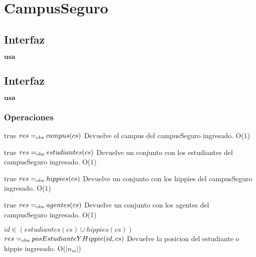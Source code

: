 
\section{CampusSeguro}

\subsection{Interfaz}

$\textbf{usa}$  


\subsection{Interfaz}

$\textbf{usa}$  


\subsubsection*{Operaciones}



 {true}
 {$res =_{\mathrm{obs}} campus(cs)$}
 {Devuelve el campus del campusSeguro ingresado.}
 {O($1$)}
 {}
 
 {true}
 {$res =_{\mathrm{obs}} estudiantes(cs)$}
 {Devuelve un conjunto con los estudiantes del campusSeguro ingresado.}
 {O($1$)}
 {}
 
 {true}
 {$res =_{\mathrm{obs}} hippies(cs)$}
 {Devuelve un conjunto con los hippies del campusSeguro ingresado.}
 {O($1$)}
 {}

 {true}
 {$res =_{\mathrm{obs}} agentes(cs)$}
 {Devuelve un conjunto con los agentes del campusSeguro ingresado.}
 {O(1)}
 {}
 
 {$id \in (estudiantes(cs) \cup hippies(cs))$}
 {$res =_{\mathrm{obs}} posEstudianteYHippie(id, cs)$}
 {Devuelve la posicion del estudiante o hippie ingresado.}
 {O($|n_m|$)}
 {}


